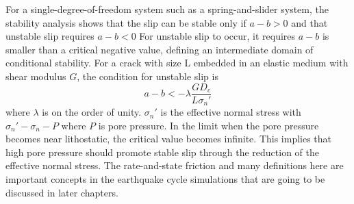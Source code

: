 For a single-degree-of-freedom system such as a spring-and-slider system, the stability analysis shows that the slip can be stable only if $a - b > 0$ and that unstable slip requires $a - b < 0$  
For unstable slip to occur, it requires $a - b$ is smaller than a critical negative value, defining an intermediate domain of conditional stability.
For a crack with size L embedded in an elastic medium with shear modulus $G$, the condition for unstable slip is 
\begin{equation}
    a - b < - \lambda \frac{GD_c}{L\sigma_n'}
\end{equation}
where $\lambda$ is on the order of unity. 
$\sigma_n'$ is the effective normal stress with $\sigma_n' - \sigma_n - P$ where $P$ is pore pressure.
In the limit when the pore pressure becomes near lithostatic, the critical value becomes infinite.
This implies that high pore pressure should promote stable slip through the reduction of the effective normal stress.
The rate-and-state friction and many definitions here are important concepts in the earthquake cycle simulations that are going to be discussed in later chapters.